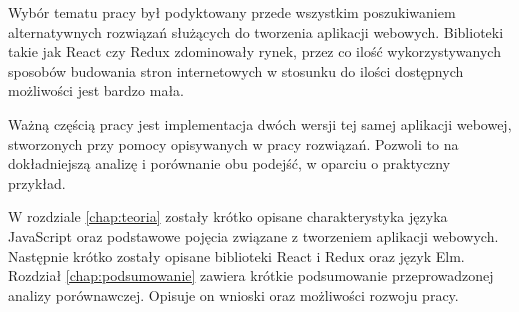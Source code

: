 Wybór tematu pracy był podyktowany przede wszystkim poszukiwaniem alternatywnych rozwiązań służących do tworzenia aplikacji webowych. Biblioteki takie jak React czy Redux zdominowały rynek, przez co ilość wykorzystywanych sposobów budowania stron internetowych w stosunku do ilości dostępnych możliwości jest bardzo mała.

Ważną częścią pracy jest implementacja dwóch wersji tej samej aplikacji webowej, stworzonych przy pomocy opisywanych w pracy rozwiązań. Pozwoli to na dokładniejszą analizę i porównanie obu podejść, w oparciu o praktyczny przykład.

W rozdziale \ref{chap:teoria} zostały krótko opisane charakterystyka języka JavaScript oraz podstawowe pojęcia związane z tworzeniem aplikacji webowych. Następnie krótko zostały opisane biblioteki React i Redux oraz język Elm.
Rozdział \ref{chap:podsumowanie} zawiera krótkie podsumowanie przeprowadzonej analizy porównawczej. Opisuje on wnioski oraz możliwości rozwoju pracy.
